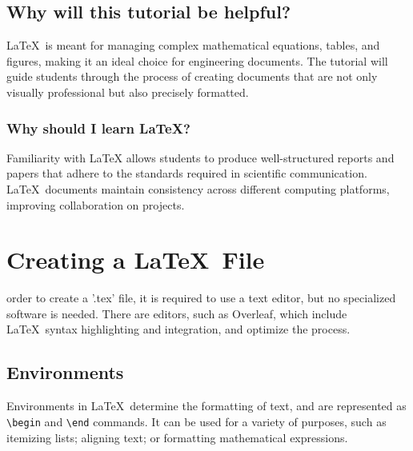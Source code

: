 \documentclass[12pt,journal,compsoc]{IEEEtran}
\begin{document}

\subsection{Why will this tutorial be helpful?}
\LaTeX\ is meant for managing complex mathematical equations, tables, and figures, making it an ideal choice for engineering documents. The tutorial will guide students through the process of creating documents that are not only visually professional but also precisely formatted.



\subsubsection{Why should I learn \LaTeX{}?}
Familiarity with LaTeX allows students to produce well-structured reports and papers that adhere to the standards required in scientific communication. \LaTeX\ documents maintain consistency across different computing platforms, improving collaboration on projects. 

\section{Creating a \LaTeX\ File}
 order to create a '.tex' file, it is required to use a text editor, but no specialized software is needed. There are editors, such as Overleaf, which include \LaTeX\ syntax highlighting and integration, and optimize the process.

\subsection{Environments}

Environments in \LaTeX\ determine the formatting of text, and are represented as \texttt{\textbackslash begin} and \texttt{\textbackslash end} commands. It can be used for a variety of purposes, such as itemizing lists; aligning text; or formatting mathematical expressions.
\end{document}
